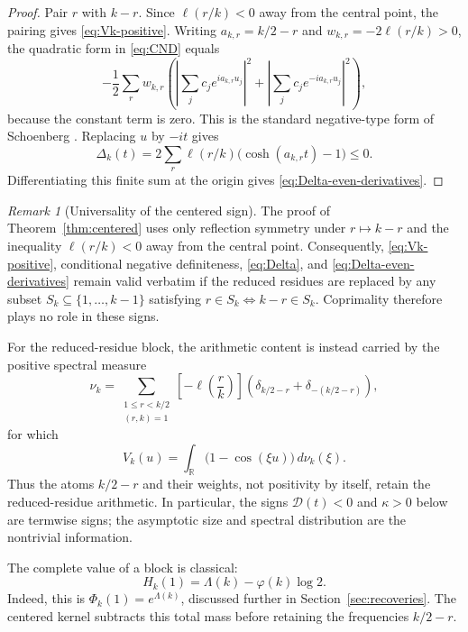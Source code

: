 \documentclass[11pt]{amsart}
\numberwithin{equation}{section}
\theoremstyle{definition}
\theoremstyle{remark}
\newtheorem{remark}[theorem]{Remark}
\begin{document}
\begin{proof}
Pair \(r\) with \(k-r\).  Since \(\ell(r/k)<0\) away from the central
point, the pairing gives \eqref{eq:Vk-positive}.  Writing
\(a_{k,r}=k/2-r\) and \(w_{k,r}=-2\ell(r/k)>0\), the quadratic form in
\eqref{eq:CND} equals
\[
 -\frac12\sum_r w_{k,r}
 \left(\left|\sum_jc_je^{ia_{k,r}u_j}\right|^2
 +\left|\sum_jc_je^{-ia_{k,r}u_j}\right|^2\right),
\]
because the constant term is zero.  This is the standard negative-type
form of Schoenberg \cite{Schoenberg1938}.  Replacing \(u\) by \(-it\)
gives
\[
 \Delta_k(t)=2\sum_r\ell(r/k)
 \bigl(\cosh(a_{k,r}t)-1\bigr)\leq0.
\]
Differentiating this finite sum at the origin gives
\eqref{eq:Delta-even-derivatives}.
\end{proof}

\begin{remark}[Universality of the centered sign]\label{rem:universal-centered}
The proof of Theorem~\ref{thm:centered} uses only reflection symmetry
under \(r\mapsto k-r\) and the inequality \(\ell(r/k)<0\) away from the
central point.  Consequently, \eqref{eq:Vk-positive}, conditional negative
definiteness, \eqref{eq:Delta}, and \eqref{eq:Delta-even-derivatives}
remain valid verbatim if the reduced residues are replaced by any subset
\(S_k\subseteq\{1,\ldots,k-1\}\) satisfying
\(r\in S_k\Longleftrightarrow k-r\in S_k\).  Coprimality therefore plays
no role in these signs.

For the reduced-residue block, the arithmetic content is instead carried
by the positive spectral measure
\begin{equation}\label{eq:nu-k}
 \nu_k=\sum_{\substack{1\leq r<k/2\\(r,k)=1}}
 \left[-\ell\!\left(\frac rk\right)\right]
 \left(\delta_{k/2-r}+\delta_{-(k/2-r)}\right),
\end{equation}
for which
\[
 V_k(u)=\int_{\mathbb R}\bigl(1-\cos(\xi u)\bigr)\,d\nu_k(\xi).
\]
Thus the atoms \(k/2-r\) and their weights, not positivity by itself,
retain the reduced-residue arithmetic.  In particular, the signs
\(\mathcal D(t)<0\) and \(\kappa>0\) below are termwise signs; the
asymptotic size and spectral distribution are the nontrivial information.
\end{remark}

The complete value of a block is classical:
\begin{equation}\label{eq:H-classical}
 H_k(1)=\Lambda(k)-\varphi(k)\log2.
\end{equation}
Indeed, this is \(\Phi_k(1)=e^{\Lambda(k)}\), discussed further in
Section~\ref{sec:recoveries}.  The centered kernel subtracts this total
mass before retaining the frequencies \(k/2-r\).
\end{document}
